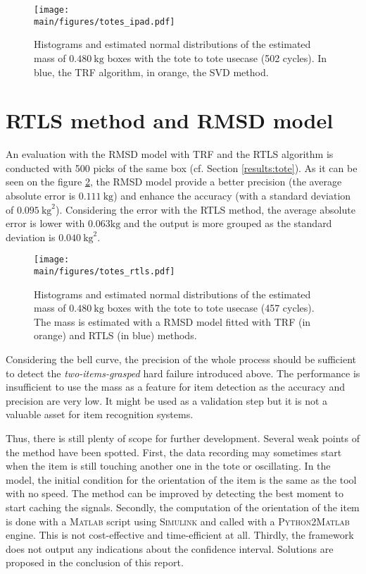 \documentclass[/home/francois/latex/report/main.tex]{subfiles}
\begin{document}
\begin{figure}
  \centering
  \texttt{[image: \\main/figures/totes\_ipad.pdf]}
  \caption{Histograms and estimated normal distributions of the estimated mass of $0.480 \ \si{\kilogram}$ boxes with the tote to tote usecase (502 cycles). In blue, the \ac{TRF} algorithm, in orange, the \ac{SVD} method.}
  \label{fig:results:rigid-ls-tote}
\end{figure}

\section{\ac{RTLS} method and \ac{RMSD} model}

An evaluation with the \ac{RMSD} model with \ac{TRF} and the \ac{RTLS} algorithm is conducted with 500 picks of the same box (cf. Section \ref{results:tote}). As it can be seen on the figure \ref{fig:results:rmsd-rtls-tote}, the \ac{RMSD} model provide a better precision (the average absolute error is $0.111 \ \si{\kilogram}$) and enhance the accuracy (with a standard deviation of $0.095 \ \si{\kilogram\squared}$). Considering the error with the \ac{RTLS} method, the average absolute error is lower with $0.063 \si{\kilogram}$ and the output is more grouped as the standard deviation is $0.040 \ \si{\kilogram\squared}$.

\begin{figure}
  \centering
  \texttt{[image: \\main/figures/totes\_rtls.pdf]}
  \caption{Histograms and estimated normal distributions of the estimated mass of $0.480 \ \si{\kilogram}$ boxes with the tote to tote usecase (457 cycles). The mass is estimated with a \ac{RMSD} model fitted with \ac{TRF} (in orange) and \ac{RTLS} (in blue) methods.}
  \label{fig:results:rmsd-rtls-tote}
\end{figure}

Considering the bell curve, the precision of the whole process should be sufficient to detect the \textit{two-items-grasped} hard failure introduced above. The performance is insufficient to use the mass as a feature for item detection as the accuracy and precision are very low. It might be used as a validation step but it is not a valuable asset for item recognition systems.

Thus, there is still plenty of scope for further development. Several weak points of the method have been spotted. First, the data recording may sometimes start when the item is still touching another one in the tote or oscillating. In the model, the initial condition for the orientation of the item is the same as the tool with no speed. The method can be improved by detecting the best moment to start caching the signals. Secondly, the computation of the orientation of the item is done with a \textsc{Matlab} script using \textsc{Simulink} and called with a \textsc{Python2Matlab} engine. This is not cost-effective and time-efficient at all. Thirdly, the framework does not output any indications about the confidence interval. Solutions are proposed in the conclusion of this report.
\end{document}
